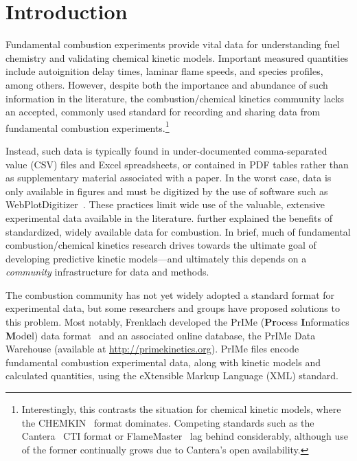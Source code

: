 \documentclass[12pt]{ijck}
\begin{document}
\section{Introduction}
%
Fundamental combustion experiments provide vital data for understanding fuel
chemistry and validating chemical kinetic models. Important measured quantities
include autoignition delay times, laminar flame speeds, and species profiles,
among others. However, despite both the importance and abundance of such
information in the literature, the combustion\slash chemical kinetics community
lacks an accepted, commonly used standard for recording and sharing data from
fundamental combustion experiments.\footnote{Interestingly, this contrasts the
situation for chemical kinetic models, where the CHEMKIN~\autocite{Kee:1996ck}
format dominates. Competing standards such as the
Cantera~\autocite{Cantera:2.3.0} CTI format or
FlameMaster~\autocite{FlameMaster:ref} lag behind considerably,
although use of the former continually grows due to Cantera's open availability.
}

Instead, such data is typically found in under-documented comma-separated value
(CSV) files and Excel spreadsheets, or contained in PDF tables rather than as
supplementary material associated with a paper. In the worst case, data is only
available in figures and must be digitized by the use of software such as
WebPlotDigitizer~\autocite{WebPlotDigitizer}. These practices limit wide use
of the valuable, extensive experimental data available in the literature.
\textcite{Frenklach:2007bm} further explained the benefits of standardized,
widely available data for combustion. In brief, much of fundamental
combustion\slash chemical kinetics research drives towards the ultimate goal of
developing predictive kinetic models---and ultimately this depends on a
\emph{community} infrastructure for data and methods.

The combustion community has not yet widely adopted a standard format for
experimental data, but some researchers and groups have proposed solutions to
this problem. Most notably, Frenklach developed the PrIMe (\textbf{Pr}ocess
\textbf{I}nformatics \textbf{M}od\textbf{e}l) data
format~\autocite{Frenklach:2007bm,You:2011hy} and an associated online database,
the PrIMe Data Warehouse (available at \url{http://primekinetics.org}).
PrIMe files encode fundamental
combustion experimental data, along with kinetic models and calculated
quantities, using the eXtensible Markup Language (XML) standard.
\end{document}
